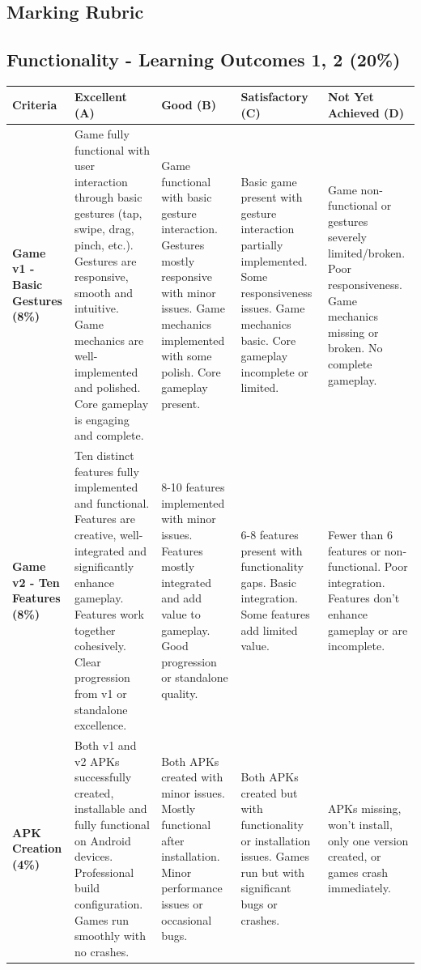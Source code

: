 \documentclass{article}
\begin{document}
\begin{landscape}

\section*{Marking Rubric}

\subsection*{Functionality - Learning Outcomes 1, 2 (20\%)}

\renewcommand{\arraystretch}{1.5}
\begin{tabular}{|p{5cm}|p{4cm}|p{4cm}|p{4cm}|p{4cm}|}
\hline
\textbf{Criteria} & \textbf{Excellent (A)} & \textbf{Good (B)} & \textbf{Satisfactory (C)} & \textbf{Not Yet Achieved (D)} \\ \hline

\textbf{Game v1 - Basic Gestures (8\%)} & 
Game fully functional with user interaction through basic gestures (tap, swipe, drag, pinch, etc.). Gestures are responsive, smooth and intuitive. Game mechanics are well-implemented and polished. Core gameplay is engaging and complete. & 
Game functional with basic gesture interaction. Gestures mostly responsive with minor issues. Game mechanics implemented with some polish. Core gameplay present. & 
Basic game present with gesture interaction partially implemented. Some responsiveness issues. Game mechanics basic. Core gameplay incomplete or limited. & 
Game non-functional or gestures severely limited/broken. Poor responsiveness. Game mechanics missing or broken. No complete gameplay. \\ \hline

\textbf{Game v2 - Ten Features (8\%)} & 
Ten distinct features fully implemented and functional. Features are creative, well-integrated and significantly enhance gameplay. Features work together cohesively. Clear progression from v1 or standalone excellence. & 
8-10 features implemented with minor issues. Features mostly integrated and add value to gameplay. Good progression or standalone quality. & 
6-8 features present with functionality gaps. Basic integration. Some features add limited value. & 
Fewer than 6 features or non-functional. Poor integration. Features don't enhance gameplay or are incomplete. \\ \hline

\textbf{APK Creation (4\%)} & 
Both v1 and v2 APKs successfully created, installable and fully functional on Android devices. Professional build configuration. Games run smoothly with no crashes. & 
Both APKs created with minor issues. Mostly functional after installation. Minor performance issues or occasional bugs. & 
Both APKs created but with functionality or installation issues. Games run but with significant bugs or crashes. & 
APKs missing, won't install, only one version created, or games crash immediately. \\ \hline


\end{tabular}
\end{landscape}
\end{document}
